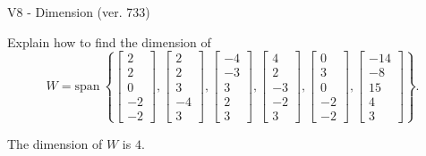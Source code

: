 \begin{exercise}
  \begin{exerciseTitle}V8 - Dimension (ver. 733)\end{exerciseTitle}
  \begin{exerciseStatement}
    Explain how to find the dimension of 
\[W=\mathrm{span}\ \left\{\left[\begin{array}{r}
2 \\
2 \\
0 \\
-2 \\
-2
\end{array}\right] , \left[\begin{array}{r}
2 \\
2 \\
3 \\
-4 \\
3
\end{array}\right] , \left[\begin{array}{r}
-4 \\
-3 \\
3 \\
2 \\
3
\end{array}\right] , \left[\begin{array}{r}
4 \\
2 \\
-3 \\
-2 \\
3
\end{array}\right] , \left[\begin{array}{r}
0 \\
3 \\
0 \\
-2 \\
-2
\end{array}\right] , \left[\begin{array}{r}
-14 \\
-8 \\
15 \\
4 \\
3
\end{array}\right]\right\}.\]



  \end{exerciseStatement}
  \begin{exerciseAnswer}
   The dimension of \(W\) is  \(4\).
  


  \end{exerciseAnswer}
\end{exercise}
